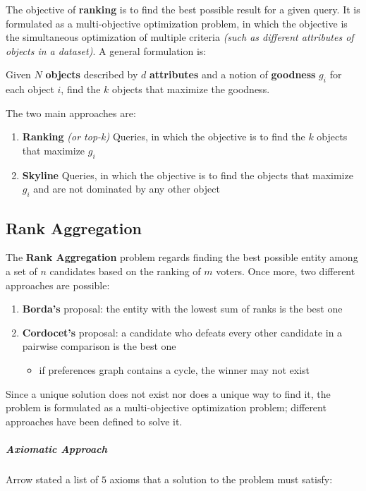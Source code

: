 \documentclass[english]{article}
\begin{document}
The objective of \textbf{ranking} is to find the best possible result for a given query.
It is formulated as a multi-objective optimization problem, in which the objective is the simultaneous optimization of multiple criteria \textit{(such as different attributes of objects in a dataset)}.
A general formulation is:

Given \(N\) \textbf{objects} described by \(d\) \textbf{attributes} and a notion of \textbf{goodness} \(g_i\) for each object \(i\), find the \(k\) objects that maximize the goodness.

The two main approaches are:

\begin{enumerate}
  \item \textbf{Ranking} \textit{(or top-k)} Queries, in which the objective is to find the \(k\) objects that maximize \(g_i\)
  \item \textbf{Skyline} Queries, in which the objective is to find the objects that maximize \(g_i\) and are not dominated by any other object
\end{enumerate}

\subsection{Rank Aggregation}

The \textbf{Rank Aggregation} problem regards finding the best possible entity among a set of \(n\) candidates based on the ranking of \(m\) voters.
Once more, two different approaches are possible:

\begin{enumerate}
  \item \textbf{Borda's} proposal: the entity with the lowest sum of ranks is the best one
  \item \textbf{Cordocet's} proposal: a candidate who defeats every other candidate in a pairwise comparison is the best one
        \begin{itemize}[label=\xmarkthin]
          \item if preferences graph contains a cycle, the winner may not exist
        \end{itemize}
\end{enumerate}

\bigskip
Since a unique solution does not exist nor does a unique way to find it, the problem is formulated as a multi-objective optimization problem;
different approaches have been defined to solve it.

\subparagraph*{Axiomatic Approach}
Arrow stated a list of \(5\) axioms that a solution to the problem must satisfy:
\end{document}

